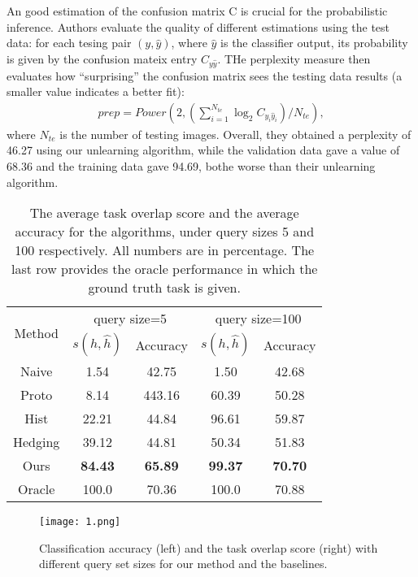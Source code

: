 \documentclass[10pt,twocolumn,letterpaper]{article}
\begin{document}
An good estimation of the confusion matrix C is crucial for the probabilistic inference. Authors evaluate the quality of different estimations using the test data: for each tesing pair $(y,\hat{y})$, where $\hat{y}$ is the classifier output, its probability is given by the confusion mateix entry $C_{y\hat{y}}$. THe perplexity measure \cite{What} then evaluates how ``surprising'' the confusion matrix sees the testing data results (a smaller value indicates a better fit):\\
\begin{gather*}
prep = Power(2,(\sum_{i=1}^{N_{te}} \log_2C_{y_i\hat{y}_i})/N_{te}), \tag{6}
\end{gather*}
where $N_{te}$ is the number of testing images. Overall, they obtained a perplexity of 46.27 using our unlearning algorithm, while the validation data gave a value of 68.36 and the training data gave 94.69, bothe worse than their unlearning algorithm.
\begin{table}
\begin{center}
\begin{tabular}{c|cc|cc}
 \hline
 \multirow{2}{*}{Method} & \multicolumn{2}{c|}{query size=5} & \multicolumn{2}{c}{query size=100} \\ \cline{2-5} & $s(h,\hat{h})$ & Accuracy & $s(h,\hat{h})$ & Accuracy \\
 \hline
 Naive & 1.54 & 42.75 & 1.50 & 42.68 \\ 
 Proto & 8.14 & 443.16 & 60.39 & 50.28 \\
 Hist & 22.21 & 44.84 & 96.61 & 59.87 \\
 Hedging & 39.12 & 44.81 & 50.34 & 51.83 \\
 Ours & {\bf 84.43} & {\bf 65.89} & {\bf 99.37} & {\bf 70.70} \\
 \hline 
 Oracle & 100.0 & 70.36 & 100.0 & 70.88 \\
 \hline
\end{tabular}
\end{center}
\caption{The average task overlap score and the average accuracy for the algorithms, under query sizes 5 and 100 respectively. All numbers are in percentage. The last row provides the oracle performance in which the ground truth task is given.}
\label{tab}
\end{table}
\begin{figure}[t]
\begin{center}
\texttt{[image: 1.png]}
\end{center}
\caption{Classification accuracy (left) and the task overlap score (right) with different query set sizes for our method and the baselines.}
\label{fig}
\end{figure}
\end{document}

